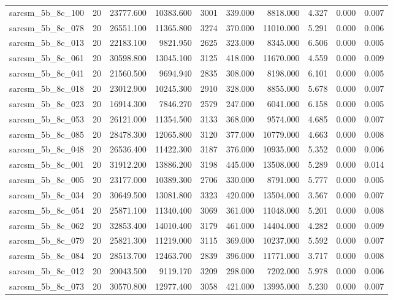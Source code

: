 \begin{tabular}{lrrrrrrrrr}
sarcsm\_5b\_8c\_100 & 20 & 23777.600 & 10383.600 & 3001 & 339.000 & 8818.000 & 4.327 & 0.000 & 0.007 \\
sarcsm\_5b\_8c\_078 & 20 & 26551.100 & 11365.800 & 3274 & 370.000 & 11010.000 & 5.291 & 0.000 & 0.006 \\
sarcsm\_5b\_8c\_013 & 20 & 22183.100 & 9821.950 & 2625 & 323.000 & 8345.000 & 6.506 & 0.000 & 0.005 \\
sarcsm\_5b\_8c\_061 & 20 & 30598.800 & 13045.100 & 3125 & 418.000 & 11670.000 & 4.559 & 0.000 & 0.009 \\
sarcsm\_5b\_8c\_041 & 20 & 21560.500 & 9694.940 & 2835 & 308.000 & 8198.000 & 6.101 & 0.000 & 0.005 \\
sarcsm\_5b\_8c\_018 & 20 & 23012.900 & 10245.300 & 2910 & 328.000 & 8855.000 & 5.678 & 0.000 & 0.007 \\
sarcsm\_5b\_8c\_023 & 20 & 16914.300 & 7846.270 & 2579 & 247.000 & 6041.000 & 6.158 & 0.000 & 0.005 \\
sarcsm\_5b\_8c\_053 & 20 & 26121.000 & 11354.500 & 3133 & 368.000 & 9574.000 & 4.685 & 0.000 & 0.007 \\
sarcsm\_5b\_8c\_085 & 20 & 28478.300 & 12065.800 & 3120 & 377.000 & 10779.000 & 4.663 & 0.000 & 0.008 \\
sarcsm\_5b\_8c\_048 & 20 & 26536.400 & 11422.300 & 3187 & 376.000 & 10935.000 & 5.352 & 0.000 & 0.006 \\
sarcsm\_5b\_8c\_001 & 20 & 31912.200 & 13886.200 & 3198 & 445.000 & 13508.000 & 5.289 & 0.000 & 0.014 \\
sarcsm\_5b\_8c\_005 & 20 & 23177.000 & 10389.300 & 2706 & 330.000 & 8791.000 & 5.777 & 0.000 & 0.005 \\
sarcsm\_5b\_8c\_034 & 20 & 30649.500 & 13081.800 & 3323 & 420.000 & 13504.000 & 3.567 & 0.000 & 0.007 \\
sarcsm\_5b\_8c\_054 & 20 & 25871.100 & 11340.400 & 3069 & 361.000 & 11048.000 & 5.201 & 0.000 & 0.008 \\
sarcsm\_5b\_8c\_062 & 20 & 32853.400 & 14010.400 & 3179 & 461.000 & 14404.000 & 4.282 & 0.000 & 0.009 \\
sarcsm\_5b\_8c\_079 & 20 & 25821.300 & 11219.000 & 3115 & 369.000 & 10237.000 & 5.592 & 0.000 & 0.007 \\
sarcsm\_5b\_8c\_084 & 20 & 28513.700 & 12463.700 & 2839 & 396.000 & 11771.000 & 3.717 & 0.000 & 0.008 \\
sarcsm\_5b\_8c\_012 & 20 & 20043.500 & 9119.170 & 3209 & 298.000 & 7202.000 & 5.978 & 0.000 & 0.006 \\
sarcsm\_5b\_8c\_073 & 20 & 30570.800 & 12977.400 & 3058 & 421.000 & 13995.000 & 5.230 & 0.000 & 0.007 \\

\end{tabular}
